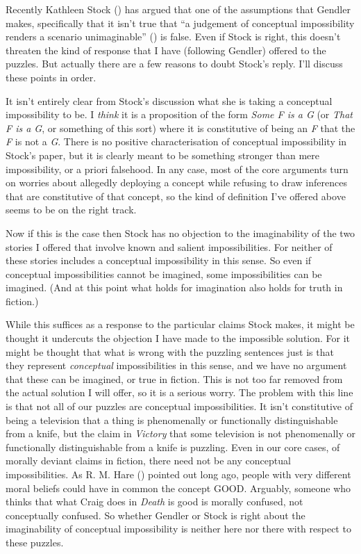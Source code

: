 \documentclass[
  10pt,
  letterpaper,
  DIV=11,
  numbers=noendperiod,
  twoside]{scrartcl}
\begin{document}
Recently Kathleen Stock () has argued that
one of the assumptions that Gendler makes, specifically that it isn't
true that ``a judgement of conceptual impossibility renders a scenario
unimaginable'' () is false.
Even if Stock is right, this doesn't threaten the kind of response that
I have (following Gendler) offered to the puzzles. But actually there
are a few reasons to doubt Stock's reply. I'll discuss these points in
order.

It isn't entirely clear from Stock's discussion what she is taking a
conceptual impossibility to be. I \emph{think} it is a proposition of
the form \emph{Some F is a G} (or \emph{That F is a G}, or something of
this sort) where it is constitutive of being an \emph{F} that the
\emph{F} is not a \emph{G}. There is no positive characterisation of
conceptual impossibility in Stock's paper, but it is clearly meant to be
something stronger than mere impossibility, or a priori falsehood. In
any case, most of the core arguments turn on worries about allegedly
deploying a concept while refusing to draw inferences that are
constitutive of that concept, so the kind of definition I've offered
above seems to be on the right track.

Now if this is the case then Stock has no objection to the imaginability
of the two stories I offered that involve known and salient
impossibilities. For neither of these stories includes a conceptual
impossibility in this sense. So even if conceptual impossibilities
cannot be imagined, some impossibilities can be imagined. (And at this
point what holds for imagination also holds for truth in fiction.)

While this suffices as a response to the particular claims Stock makes,
it might be thought it undercuts the objection I have made to the
impossible solution. For it might be thought that what is wrong with the
puzzling sentences just is that they represent \emph{conceptual}
impossibilities in this sense, and we have no argument that these can be
imagined, or true in fiction. This is not too far removed from the
actual solution I will offer, so it is a serious worry. The problem with
this line is that not all of our puzzles are conceptual impossibilities.
It isn't constitutive of being a television that a thing is phenomenally
or functionally distinguishable from a knife, but the claim in
\emph{Victory} that some television is not phenomenally or functionally
distinguishable from a knife is puzzling. Even in our core cases, of
morally deviant claims in fiction, there need not be any conceptual
impossibilities. As R. M. Hare () pointed
out long ago, people with very different moral beliefs could have in
common the concept GOOD. Arguably, someone who thinks that what Craig
does in \emph{Death} is good is morally confused, not conceptually
confused. So whether Gendler or Stock is right about the imaginability
of conceptual impossibility is neither here nor there with respect to
these puzzles.
\end{document}
